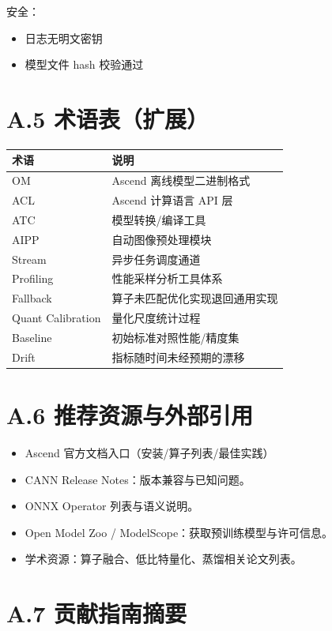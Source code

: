 安全：

\begin{itemize}
\tightlist
\item[$\square$]
  日志无明文密钥
\item[$\square$]
  模型文件 hash 校验通过
\end{itemize}

\section{A.5 术语表（扩展）}\label{src-book-appendix-h8}

{ %
\begin{longtable}[]{@{}ll@{}}
\toprule\noalign{}
术语 & 说明 \\
\midrule\noalign{}
\endhead
\bottomrule\noalign{}
\endlastfoot
OM & Ascend 离线模型二进制格式 \\
ACL & Ascend 计算语言 API 层 \\
ATC & 模型转换/编译工具 \\
AIPP & 自动图像预处理模块 \\
Stream & 异步任务调度通道 \\
Profiling & 性能采样分析工具体系 \\
Fallback & 算子未匹配优化实现退回通用实现 \\
Quant Calibration & 量化尺度统计过程 \\
Baseline & 初始标准对照性能/精度集 \\
Drift & 指标随时间未经预期的漂移 \\
\end{longtable}
}

\section{A.6 推荐资源与外部引用}\label{src-book-appendix-h9}

\begin{itemize}
\tightlist
\item
  Ascend 官方文档入口（安装/算子列表/最佳实践）
\item
  CANN Release Notes：版本兼容与已知问题。
\item
  ONNX Operator 列表与语义说明。
\item
  Open Model Zoo / ModelScope：获取预训练模型与许可信息。
\item
  学术资源：算子融合、低比特量化、蒸馏相关论文列表。
\end{itemize}

\section{A.7 贡献指南摘要}\label{src-book-appendix-h10}

